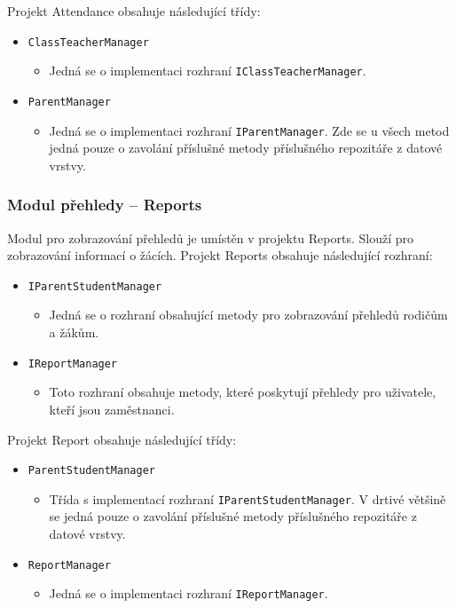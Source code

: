 Projekt Attendance obsahuje následující třídy:
\begin{itemize}
    \item \texttt{ClassTeacherManager}
    \begin{itemize}
        \item Jedná se o implementaci rozhraní \texttt{IClassTeacherManager}.
    \end{itemize}
    
    \item \texttt{ParentManager}
    \begin{itemize}
        \item Jedná se o implementaci rozhraní \texttt{IParentManager}. Zde se u všech metod jedná pouze o zavolání příslušné metody příslušného repozitáře z datové vrstvy.
    \end{itemize}
\end{itemize}

\subsubsection{Modul přehledy -- Reports}
Modul pro zobrazování přehledů je umístěn v projektu Reports. Slouží pro zobrazování informací o žácích. Projekt Reports obsahuje následující rozhraní:
\begin{itemize}
    \item \texttt{IParentStudentManager}
    \begin{itemize}
        \item Jedná se o rozhraní obsahující metody pro zobrazování přehledů rodičům a žákům. 
    \end{itemize}
    
    \item \texttt{IReportManager}
    \begin{itemize}
        \item Toto rozhraní obsahuje metody, které poskytují přehledy pro uživatele, kteří jsou zaměstnanci.
    \end{itemize}
\end{itemize}

Projekt Report obsahuje následující třídy:
\begin{itemize}
    \item \texttt{ParentStudentManager}
    \begin{itemize}
        \item Třída s implementací rozhraní \texttt{IParentStudentManager}. V drtivé většině se jedná pouze o zavolání příslušné metody příslušného repozitáře z datové vrstvy.
    \end{itemize}
    
    \item \texttt{ReportManager}
    \begin{itemize}
        \item Jedná se o implementaci rozhraní \texttt{IReportManager}.
    \end{itemize}
\end{itemize}


